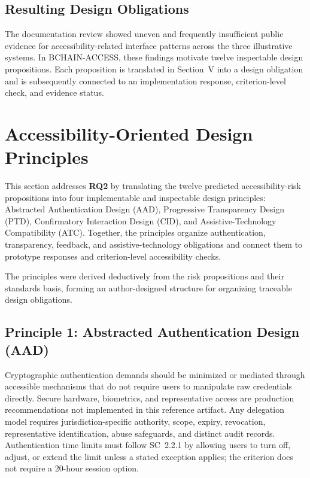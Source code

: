 \documentclass[journal]{IEEEtran}
\begin{document}
\subsection{Resulting Design Obligations}
\label{sec:gap-analysis}
The documentation review showed uneven and frequently insufficient public evidence for accessibility-related interface patterns across the three illustrative systems. In BCHAIN-ACCESS, these findings motivate twelve inspectable design propositions. Each proposition is translated in Section~V into a design obligation and is subsequently connected to an implementation response, criterion-level check, and evidence status.
\section{Accessibility-Oriented Design Principles}
\label{sec:principles}

This section addresses \textbf{RQ2} by translating the twelve predicted accessibility-risk propositions into four implementable and inspectable design principles: Abstracted Authentication Design (AAD), Progressive Transparency Design (PTD), Confirmatory Interaction Design (CID), and Assistive-Technology Compatibility (ATC). Together, the principles organize authentication, transparency, feedback, and assistive-technology obligations and connect them to prototype responses and criterion-level accessibility checks.

The principles were derived deductively from the risk propositions and their standards basis, forming an author-designed structure for organizing traceable design obligations.

\subsection{Principle 1: Abstracted Authentication Design (AAD)}

Cryptographic authentication demands should be minimized or mediated through accessible mechanisms that do not require users to manipulate raw credentials directly. Secure hardware, biometrics, and representative access are production recommendations not implemented in this reference artifact. Any delegation model requires jurisdiction-specific authority, scope, expiry, revocation, representative identification, abuse safeguards, and distinct audit records. Authentication time limits must follow SC~2.2.1 by allowing users to turn off, adjust, or extend the limit unless a stated exception applies; the criterion does not require a 20-hour session option.
\end{document}
